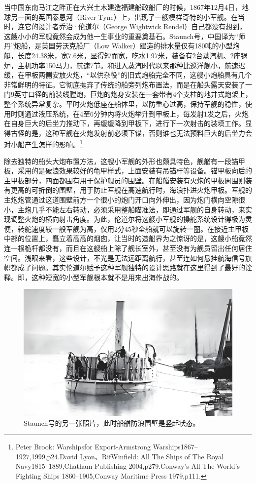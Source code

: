 \documentclass[12pt,UTF8]{ctexbook}
\begin{document}
当中国东南马江之畔正在大兴土木建造福建船政船厂的时候，1867年12月4日，地球另一面的英国泰恩河（River Tyne）上，出现了一艘模样奇特的小军舰。在当时，连它的设计者乔治·伦道尔（George Wightwick Rendel）自己都没有想到，这艘小小的军舰竟然会成为他一生事业的重要奠基石。Staunch号，中国译为“师丹”炮船，是英国劳沃克船厂（Low Walker）建造的排水量仅有180吨的小型炮艇，长度24.38米，宽7.6米，显得短而宽，吃水1.97米，装备有2台蒸汽机、2座锅炉，主机功率150马力，航速7节。和进入蒸汽时代以来那种比巡洋舰小，航速迟缓，在甲板两侧安放火炮，“以供杂役”的旧式炮船完全不同，这艘小炮船具有几个非常鲜明的特征。它彻底抛弃了传统的船旁列炮布置法，而是在船头露天安装了一门9英寸口径的前装线膛炮，巨炮的炮身安装在一套带有4个支柱的地井式炮架上，整个系统异常复杂。平时火炮低座在船体里，以防重心过高，保持军舰的稳性，使用时则通过液压系统，在4至6分钟内将火炮举升到甲板上，每发射1发之后，火炮在自身巨大的后坐力推动下，再缓缓降到甲板下，进行下一次射击的装填工作。显得古怪的是，这种军舰在火炮发射前必须下锚，否则谁也无法预料巨大的后坐力会对小船产生怎样的影响。\footnote{Peter Brook: Warshipsfor Export-Armstrong Warships1867--1927,1999,p24.David Lyon、RifWinfield: All The Ships of The Royal Navy1815--1889,Chatham Publishing 2004,p279.Conway's All The World's Fighting Ships 1860--1905,Conway Maritime Press 1979,p111.}

除去独特的船头大炮布置方法，这艘小军舰的外形也颇具特色，舰艏有一段锚甲板，采用的是破浪效果较好的龟甲样式，上面安装有吊锚杆等设备。锚甲板向后的主甲板部分，四面都围有用于保护舰员的围壁。在船艏安装有火炮的甲板周围则装有更高的可折倒的围壁，用于防止军舰在高速航行时，海浪扑进火炮甲板。军舰的主炮炮管通过这道围壁前方一个很小的炮门开口向外伸出，因为炮门横向空隙很小，主炮几乎不能左右转动，必须采用整船瞄准法，即通过军舰的自身转动，来实现调整火炮的横向射击角度。为此，伦道尔将这艘小军舰的操舵系统设计得极为灵便，转舵速度较一般军舰为高，仅用2分45秒全船就可以旋转一圈。在接近主甲板中部的位置上，矗立着高高的烟囱，让当时的造船界为之惊讶的是，这艘小船竟然连一根桅杆都没有，而且在这艘船上除了舰长室外，甚至没有为舰员留出任何居住空间。浅眼来看，这些设计，不光是无法远距离航行，甚至连如何悬挂航海信号旗帜都成了问题。其实伦道尔赋予这种军舰独特的设计思路就在这里得到了最好的诠释。即，这种短宽的小型军舰根本就不是用来出海作战的。

\begin{figure}[htbp]
	\centering
	\includegraphics[width=1\linewidth]{Images/4}
	\caption{Staunch号的另一张照片，此时船艏防浪围壁是竖起状态。}
	\label{fig:1}
\end{figure}
\end{document}
